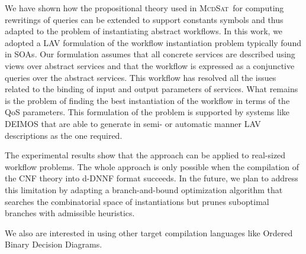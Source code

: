 \documentclass{llncs}
\newcommand{\mcdsat}{\textsc{McdSat}}
\begin{document}
We have shown how the propositional theory used in \mcdsat\ for
computing rewritings of queries can be extended to support constants
symbols and thus adapted to the problem of instantiating abstract
workflows. In this work, we adopted a LAV formulation of the
workflow instantiation problem typically found in SOAs.
Our formulation assumes that all concrete services are described
using views over abstract services and that the workflow is 
expressed as a conjunctive queries over the abstract services.
This workflow has resolved all the issues related to the
binding of input and output parameters of services. What
remains is the problem of finding the best instantiation
of the workflow in terms of the QoS parameters.
This formulation of the problem is supported by systems 
like DEIMOS that are able to generate in semi- or
automatic manner LAV descriptions as the one required.

The experimental results show that the approach can be applied to
real-sized workflow problems. The whole approach is only possible
when the compilation of the CNF theory into d-DNNF format succeeds.
In the future, we plan to address this limitation by adapting a
branch-and-bound optimization algorithm that searches the combinatorial
space of instantiations but prunes suboptimal branches with admissible
heuristics.

We also are interested in using other target compilation languages
like Ordered Binary Decision Diagrams.



\end{document}
